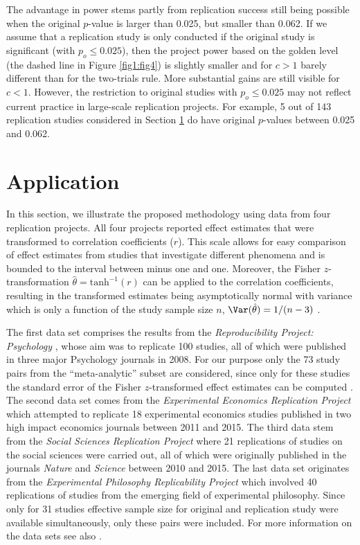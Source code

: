 The advantage in power stems partly from replication success still being
possible when the original $p$-value is larger than 0.025, but smaller than
0.062. If we assume that a replication study is only conducted if the original
study is significant (with $p_o \leq 0.025$), then the project power based on
the golden level (the dashed line in Figure \ref{fig1:fig4}) is slightly smaller
and for $c>1$ barely different than for the two-trials rule. More substantial
gains are still visible for $c < 1$. However, the restriction to original
studies with $p_o \leq 0.025$ may not reflect current practice in large-scale
replication projects. For example, 5 out of 143 replication studies considered
in Section \ref{sec1:application} do have original $p$-values between 0.025 and
0.062.


\section{Application}\label{sec1:application}
In this section, we illustrate the proposed methodology using data from four
replication projects. All four projects reported effect estimates that were
transformed to correlation coefficients ($r$). This scale allows for easy
comparison of effect estimates from studies that investigate different phenomena
and is bounded to the interval between minus one and one. Moreover, the Fisher
$z$-transformation $\hat{\theta} = \text{tanh}^{-1}(r)$ can be applied to the
correlation coefficients, resulting in the transformed estimates being
asymptotically normal with variance which is only a function of the study sample
size $n$, \ie{} $\Var(\hat{\theta}) = 1/(n - 3)$ \citep{Fisher1921}.



The first data set comprises the results from the \textit{Reproducibility
  Project: Psychology} \citep{Opensc2015}, whose aim was to replicate 100
studies, all of which were published in three major Psychology journals in 2008.
For our purpose only the 73 study pairs from the ``meta-analytic'' subset are
considered, since only for these studies the standard error of the Fisher
$z$-transformed effect estimates can be computed \citep{Johnson2016}. The second
data set comes from the \textit{Experimental Economics Replication Project}
\citep{Camerer2016} which attempted to replicate 18 experimental economics
studies published in two high impact economics journals between 2011 and 2015.
The third data stem from the \textit{Social Sciences Replication Project}
\citep{Camerer2018} where 21 replications of studies on the social sciences were
carried out, all of which were originally published in the journals
\textit{Nature} and \textit{Science} between 2010 and 2015. The last data set
originates from the \textit{Experimental Philosophy Replicability Project}
\citep{Cova2018} which involved 40 replications of studies from the emerging
field of experimental philosophy. Since only for 31 studies effective sample
size for original and replication study were available simultaneously, only
these pairs were included. For more information on the data sets see also
\citet{Pawel2020}.

